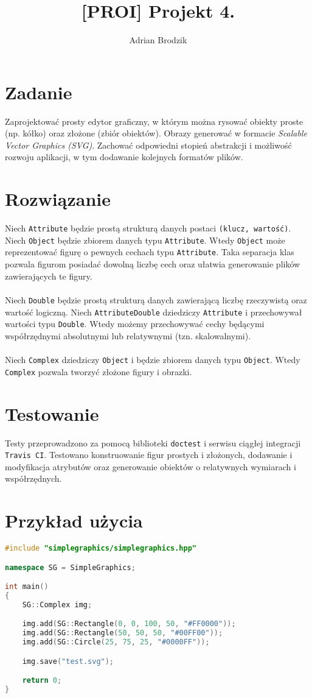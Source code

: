 \documentclass[a4paper, 12pt]{article}
\title{[PROI] Projekt 4.}
\author{Adrian Brodzik}
\begin{document}
\maketitle

\section*{Zadanie}
Zaprojektować prosty edytor graficzny, w którym można rysować obiekty proste (np. kółko) oraz złożone (zbiór obiektów). Obrazy generować w formacie \textit{Scalable Vector Graphics (SVG)}. Zachować odpowiedni stopień abstrakcji i możliwość rozwoju aplikacji, w tym dodawanie kolejnych formatów plików.

\section*{Rozwiązanie}
Niech \texttt{Attribute} będzie prostą strukturą danych postaci \texttt{(klucz, wartość)}. Niech \texttt{Object} będzie zbiorem danych typu \texttt{Attribute}. Wtedy \texttt{Object} może reprezentować figurę o pewnych cechach typu \texttt{Attribute}. Taka separacja klas pozwala figurom posiadać dowolną liczbę cech oraz ułatwia generowanie plików zawierających te figury.
\\\\
Niech \texttt{Double} będzie prostą strukturą danych zawierającą liczbę rzeczywistą oraz wartość logiczną. Niech \texttt{AttributeDouble} dziedziczy \texttt{Attribute} i przechowywał wartości typu \texttt{Double}. Wtedy możemy przechowywać cechy będącymi współrzędnymi absolutnymi lub relatywnymi (tzn. skalowalnymi).
\\\\
Niech \texttt{Complex} dziedziczy \texttt{Object} i będzie zbiorem danych typu \texttt{Object}. Wtedy \texttt{Complex} pozwala tworzyć złożone figury i obrazki.

\section*{Testowanie}
Testy przeprowadzono za pomocą biblioteki \texttt{doctest} i serwisu ciągłej integracji \texttt{Travis CI}. Testowano konstruowanie figur prostych i złożonych, dodawanie i modyfikacja atrybutów oraz generowanie obiektów o relatywnych wymiarach i współrzędnych.

\section*{Przykład użycia}
\begin{lstlisting}[language=C++]
#include "simplegraphics/simplegraphics.hpp"

namespace SG = SimpleGraphics;

int main()
{
    SG::Complex img;

    img.add(SG::Rectangle(0, 0, 100, 50, "#FF0000"));
    img.add(SG::Rectangle(50, 50, 50, "#00FF00"));
    img.add(SG::Circle(25, 75, 25, "#0000FF"));

    img.save("test.svg");

    return 0;
}
\end{lstlisting}
\end{document}

